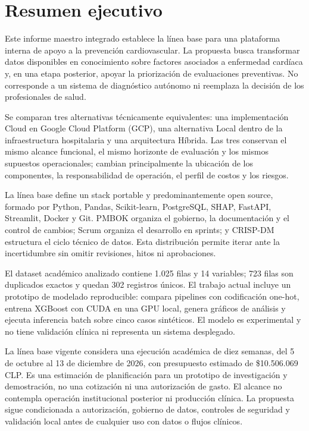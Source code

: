 \section{Resumen ejecutivo}

Este informe maestro integrado establece la línea base para una plataforma interna de apoyo a la prevención cardiovascular. La propuesta busca transformar datos disponibles en conocimiento sobre factores asociados a enfermedad cardíaca y, en una etapa posterior, apoyar la priorización de evaluaciones preventivas. No corresponde a un sistema de diagnóstico autónomo ni reemplaza la decisión de los profesionales de salud.

Se comparan tres alternativas técnicamente equivalentes: una implementación Cloud en Google Cloud Platform (GCP), una alternativa Local dentro de la infraestructura hospitalaria y una arquitectura Híbrida. Las tres conservan el mismo alcance funcional, el mismo horizonte de evaluación y los mismos supuestos operacionales; cambian principalmente la ubicación de los componentes, la responsabilidad de operación, el perfil de costos y los riesgos.

La línea base define un stack portable y predominantemente open source, formado por Python, Pandas, Scikit-learn, PostgreSQL, SHAP, FastAPI, Streamlit, Docker y Git. PMBOK organiza el gobierno, la documentación y el control de cambios; Scrum organiza el desarrollo en sprints; y CRISP-DM estructura el ciclo técnico de datos. Esta distribución permite iterar ante la incertidumbre sin omitir revisiones, hitos ni aprobaciones.

El dataset académico analizado contiene 1.025 filas y 14 variables; 723 filas son duplicados exactos y quedan 302 registros únicos. El trabajo actual incluye un prototipo de modelado reproducible: compara pipelines con codificación one-hot, entrena XGBoost con CUDA en una GPU local, genera gráficos de análisis y ejecuta inferencia batch sobre cinco casos sintéticos. El modelo es experimental y no tiene validación clínica ni representa un sistema desplegado.

La línea base vigente considera una ejecución académica de diez semanas, del 5 de octubre al 13 de diciembre de 2026, con presupuesto estimado de \$10.506.069 CLP. Es una estimación de planificación para un prototipo de investigación y demostración, no una cotización ni una autorización de gasto. El alcance no contempla operación institucional posterior ni producción clínica. La propuesta sigue condicionada a autorización, gobierno de datos, controles de seguridad y validación local antes de cualquier uso con datos o flujos clínicos.
